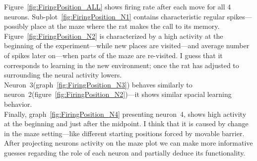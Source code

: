 \documentclass[11pt,a4paper,twocolumn]{article}
\begin{document}
Figure~\ref{fig:FiringPosition_ALL} shows firing rate after each move for all 4 neurons. Sub-plot~\ref{fig:FiringPosition_N1} contains characteristic regular spikes---possibly place at the maze where the rat makes the call to its memory.\\
Figure~\ref{fig:FiringPosition_N2} is characterized by a high activity at the beginning of the experiment---while new places are visited---and average number of spikes later on---when parts of the maze are re-visited. I guess that it corresponds to learning in the new environment; once the rat has adjusted to surrounding the neural activity lowers.\\
Neuron~3(graph~\ref{fig:FiringPosition_N3}) behaves similarly to neuron~2(figure~\ref{fig:FiringPosition_N2})---it shows similar spacial learning behavior.\\
Finally, graph~\ref{fig:FiringPosition_N4} presenting neuron~4, shows high activity at the beginning and just after the midpoint. I think that it is caused by change in the maze setting---like different starting positions forced by movable barrier.\\

After projecting neurons activity on the maze plot we can make more informative guesses regarding the role of each neuron and partially deduce its functionality.\\
\end{document}
